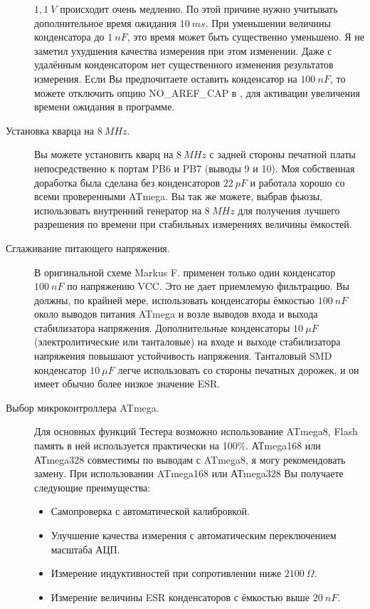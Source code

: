 \begin{description}
\(1,1~V\) происходит очень медленно. По этой причине нужно учитывать дополнительное время ожидания \(10~ms\). 
При уменьшении величины конденсатора до \(1~nF\), это время может быть существенно уменьшено. Я не заметил ухудшения 
качества измерения при этом изменении. Даже с удалённым конденсатором нет существенного изменения результатов 
измерения. Если Вы предпочитаете оставить конденсатор на \(100~nF\), то можете отключить опцию NO\_AREF\_CAP
в , для активации увеличения времени ожидания в программе.
\item[Установка кварца на \(8~MHz\).]
Вы можете установить кварц на \(8~MHz\) с задней стороны печатной платы непосредственно к портам PB6 и PB7 
(выводы 9 и 10). Моя собственная доработка была сделана без конденсаторов \(22~pF\) и работала хорошо со всеми 
проверенными ATmega. Вы так же можете, выбрав фьюзы, использовать внутренний генератор на \(8~MHz\) для получения 
лучшего разрешения по времени при стабильных измерениях величины ёмкостей.
\item[Сглаживание питающего напряжения.]
В оригинальной схеме Markus F. применен только один конденсатор \(100~nF\) по напряжению VCC. Это не дает приемлемую 
фильтрацию. Вы должны, по крайней мере, использовать конденсаторы ёмкостью \(100~nF\) около выводов питания ATmega и 
возле выводов входа и выхода стабилизатора напряжения. Дополнительные конденсаторы \(10~\mu F\)
(электролитические или танталовые) на входе и выходе стабилизатора напряжения повышают устойчивость напряжения. 
Танталовый SMD конденсатор  \(10~\mu F\) легче использовать со стороны печатных дорожек, и он имеет обычно более 
низкое значение ESR.
\item[Выбор микроконтроллера ATmega.]
Для основных функций Тестера возможно использование ATmega8, Flash память в ней используется практически на 100\%.
АТmega168 или АТmega328 совместимы по выводам с ATmega8, я могу рекомендовать замену. 
При использовании ATmega168 или АТmega328 Вы получаете следующие преимущества: 
\begin{itemize} \setlength{\itemsep}{-1.5em}
 \item Самопроверка с автоматической калибровкой.\\
 \item Улучшение качества измерения с автоматическим переключением масштаба АЦП.\\
 \item Измерение индуктивностей  при сопротивлении ниже \(2100~\Omega\).\\
 \item Измерение величины ESR конденсаторов с ёмкостью выше \(20~nF\).\\

\end{itemize}
\end{description}
